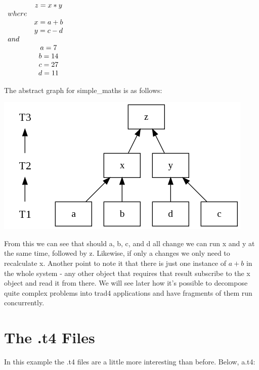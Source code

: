\documentclass{report}
\begin{document}
\begin{math}
  \begin{array}{ l c }
        & z = x * y   \\
        where         \\
        & x = a + b   \\
        & y = c - d   \\
        and           \\
        & a = 7       \\
        & b = 14      \\
        & c = 27      \\
        & d = 11      \\
  \end{array} 
\end{math}

The abstract graph for simple_maths is as follows:

\includegraphics[scale=0.5]{simplemathsabstract.png}

From this we can see that should a, b, c, and d all change we can run x and y at the same time, followed by z. Likewise, if only a changes we only need to recalculate x. Another point to note it that there is just one instance of \begin{math} a + b\end{math} in the whole system - any other object that requires that result subscribe to the x object and read it from there. We will see later how it's possible to decompose quite complex problems into trad4 applications and have fragments of them run concurrently.

\section{The .t4 Files}

In this example the .t4 files are a little more interesting than before. Below, a.t4:
\end{document}
